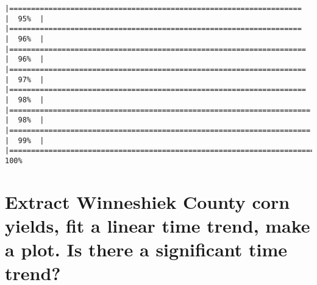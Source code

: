 \documentclass[
]{book}
\newenvironment{Shaded}{\begin{snugshade}}{\end{snugshade}}
\newcommand{\CommentTok}[1]{\textcolor[rgb]{0.56,0.35,0.01}{\textit{#1}}}
\newcommand{\FunctionTok}[1]{\textcolor[rgb]{0.00,0.00,0.00}{#1}}
\newcommand{\NormalTok}[1]{#1}
\newcommand{\OtherTok}[1]{\textcolor[rgb]{0.56,0.35,0.01}{#1}}
\newcommand{\SpecialCharTok}[1]{\textcolor[rgb]{0.00,0.00,0.00}{#1}}
\begin{document}
\begin{verbatim}
|===================================================================   |  95%  |                                                                              |===================================================================   |  96%  |                                                                              |====================================================================  |  96%  |                                                                              |====================================================================  |  97%  |                                                                              |====================================================================  |  98%  |                                                                              |===================================================================== |  98%  |                                                                              |===================================================================== |  99%  |                                                                              |======================================================================| 100%
\end{verbatim}

\begin{Shaded}
\end{Shaded}

\hypertarget{extract-winneshiek-county-corn-yields-fit-a-linear-time-trend-make-a-plot.-is-there-a-significant-time-trend}{%
\section{Extract Winneshiek County corn yields, fit a linear time trend, make a plot. Is there a significant time trend?}\label{extract-winneshiek-county-corn-yields-fit-a-linear-time-trend-make-a-plot.-is-there-a-significant-time-trend}}
\end{document}

